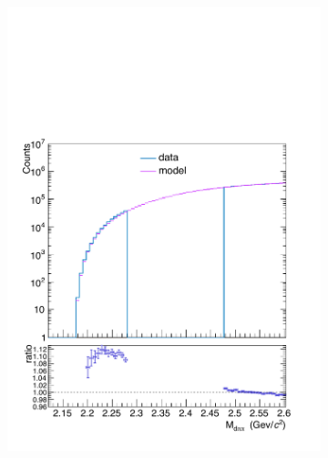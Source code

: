 \begin{figure}
\begin{subfigure}{.33\textwidth}
  \includegraphics[width=\linewidth]{gfx/PEMimp1}
  \caption{}
  \label{fig:pem_imp12}
\end{subfigure}
\begin{subfigure}{.33\textwidth}
  \centering
  \captionsetup{justification=centering}

\end{subfigure}
\end{figure}
